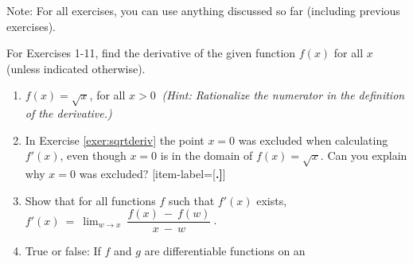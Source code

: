 \divider
\vspace{3mm}
\startexercises\label{sec1dot2}
{\small
\par\noindent Note: For all exercises, you can use anything
discussed so far (including previous exercises).\vspace{2mm}
\par\noindent For Exercises 1-11, find the derivative of the
given function $f(x)$ for all $x$ (unless indicated otherwise).
\begin{enumerate}[item-label={\bfseries \arabic*.}]
 \item\label{exer:sqrtderiv} $f(x) = \sqrt{x}$, for all $x > 0~$ \emph{(Hint:
 Rationalize the numerator in the definition of the derivative.)}
 \item In Exercise \ref{exer:sqrtderiv} the point $x=0$ was excluded when
 calculating $f'(x)$, even though $x=0$ is in the domain of $f(x) = \sqrt{x}$.
 Can you explain why $x=0$ was excluded?
[item-label={{[\bfseries \arabic*.]}}]
 \item Show that for all functions $f$ such that $f'(x)$ exists,
$f'(x) ~=~ \displaystyle\lim_{w \to x} ~\dfrac{f(x) ~-~ f(w)}{x ~-~ w} ~$.
 \item True or false: If $f$ and $g$ are differentiable functions on an

\end{enumerate}}
